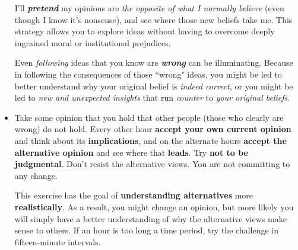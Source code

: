 \documentclass[11pt]{article}
\begin{document}
\begin{itemize}
I’ll \emph{\textbf{pretend}} my opinions are \emph{the opposite of what I normally believe} (even though I know it’s nonsense), and see where those new beliefs take me. This strategy allows you to explore ideas without having to overcome deeply ingrained moral
or institutional prejudices. 

Even \emph{following} ideas that you know are \emph{\textbf{wrong}} can be illuminating. Because in following the consequences of those ``wrong" ideas, you might be led to better understand why your original belief is \emph{indeed correct}, or you might be led to \emph{new and unexpected insights} that run \emph{counter} to \emph{your original beliefs}.

\item \begin{exercise}
Take some opinion that you hold that other people (those who clearly are wrong) do not hold. Every other hour \textbf{accept your own current opinion} and think about its \textbf{implications}, and on the alternate hours \textbf{accept the alternative opinion} and see where that \textbf{leads}. Try \textbf{not to be judgmental}. Don’t resist the alternative views. You are not committing to any change. 

This exercise has the goal of \textbf{understanding alternatives} more \textbf{realistically}. As a result, you might change an opinion, but more likely you will simply have a better understanding of why the alternative views make sense to others. If an hour is too long a time period, try the challenge in fifteen-minute intervals.
\end{exercise}
\end{itemize}
\end{document}
